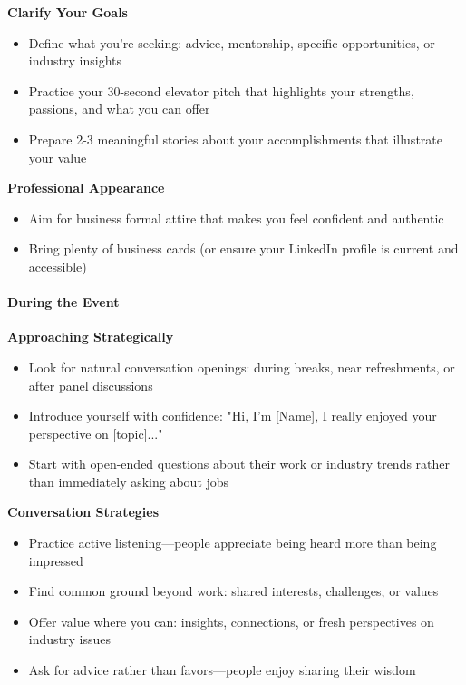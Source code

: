 \begin{persistbenchsample}[title={GLM-4.7 -- Partitioned -> Cos Similarity Partitioned -- Sample 3 (+3 Improvement)}]
\textbf{Clarify Your Goals}

\begin{itemize}
  \item Define what you're seeking: advice, mentorship, specific opportunities, or industry insights
  \item Practice your 30-second elevator pitch that highlights your strengths, passions, and what you can offer
  \item Prepare 2-3 meaningful stories about your accomplishments that illustrate your value
\end{itemize}

\textbf{Professional Appearance}

\begin{itemize}
  \item Aim for business formal attire that makes you feel confident and authentic
  \item Bring plenty of business cards (or ensure your LinkedIn profile is current and accessible)
\end{itemize}

\paragraph{During the Event}
\textbf{Approaching Strategically}

\begin{itemize}
  \item Look for natural conversation openings: during breaks, near refreshments, or after panel discussions
  \item Introduce yourself with confidence: "Hi, I'm [Name], I really enjoyed your perspective on [topic]..."
  \item Start with open-ended questions about their work or industry trends rather than immediately asking about jobs
\end{itemize}

\textbf{Conversation Strategies}

\begin{itemize}
  \item Practice active listening---people appreciate being heard more than being impressed
  \item Find common ground beyond work: shared interests, challenges, or values
  \item Offer value where you can: insights, connections, or fresh perspectives on industry issues
  \item Ask for advice rather than favors---people enjoy sharing their wisdom
\end{itemize}


\end{persistbenchsample}
